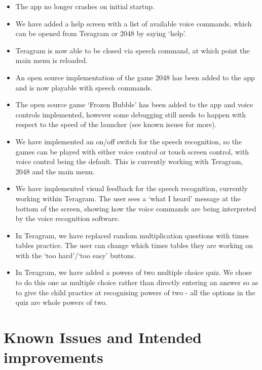 \documentclass[11pt, oneside]{article}
\begin{document}
\begin{itemize}
\item The app no longer crashes on initial startup.
  \item We have added a help screen with a list of available voice commands, which can be opened from Teragram or 2048 by saying `help'.
	\item Teragram is now able to be closed via speech command, at
          which point the main menu is reloaded.
	\item An open source implementation of the game 2048 has been
          added to the app and is now playable with speech commands.
	\item The open source game `Frozen Bubble' has been added to
          the app and voice controls implemented, however some
          debugging still needs to happen with respect to the speed of
          the launcher (see known issues for more).
        \item We have implemented an on/off switch for the speech
          recognition, so the games can be played with either voice
          control or touch screen control, with voice control being
          the default. This is currently working with Teragram, 2048 and the
          main menu.
        \item We have implemented visual feedback for the speech
          recognition, currently working within Teragram. The user
          sees a `what I heard' message at the bottom of the screen,
          showing how the voice commands are being interpreted by the
          voice recognition software.
        \item In Teragram, we have replaced random multiplication
          questions with times tables practice. The user can change
          which times tables they are working on with the `too
          hard'/`too easy' buttons.
        \item In Teragram, we have added a powers of two multiple
          choice quiz. We chose to do this one as multiple choice
          rather than directly entering an answer so as to give the
          child practice at recognising powers of two - all the
          options in the quiz are whole powers of two.
\end{itemize}


\section{Known Issues and Intended improvements}
\end{document}
